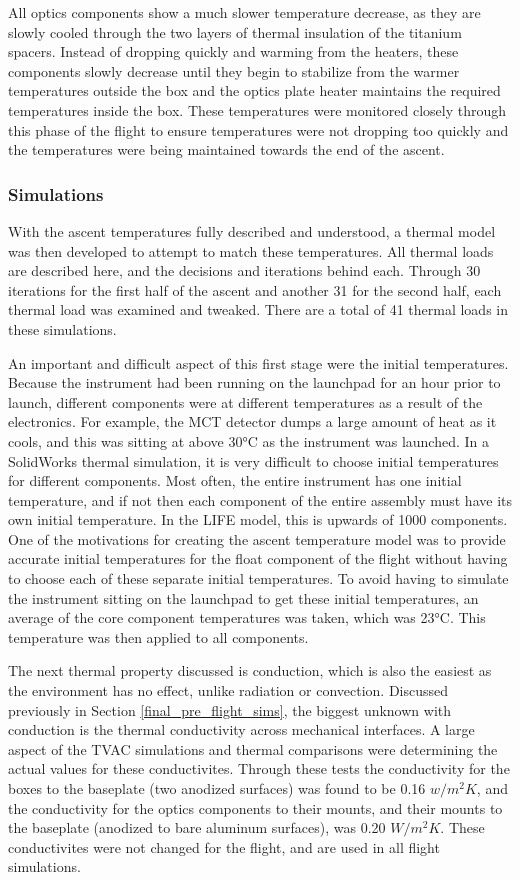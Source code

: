All optics components show a much slower temperature decrease, as they are slowly cooled through the two layers of thermal insulation of the titanium spacers. Instead of dropping quickly and warming from the heaters, these components slowly decrease until they begin to stabilize from the warmer temperatures outside the box and the optics plate heater maintains the required temperatures inside the box. These temperatures were monitored closely through this phase of the flight to ensure temperatures were not dropping too quickly and the temperatures were being maintained towards the end of the ascent.

\subsubsection{Simulations}
With the ascent temperatures fully described and understood, a thermal model was then developed to attempt to match these temperatures. All thermal loads are described here, and the decisions and iterations behind each. Through 30 iterations for the first half of the ascent and another 31 for the second half, each thermal load was examined and tweaked. There are a total of 41 thermal loads in these simulations.

An important and difficult aspect of this first stage were the initial temperatures. Because the instrument had been running on the launchpad for an hour prior to launch, different components were at different temperatures as a result of the electronics. For example, the MCT detector dumps a large amount of heat as it cools, and this was sitting at above 30°C as the instrument was launched. In a SolidWorks thermal simulation, it is very difficult to choose initial temperatures for different components. Most often, the entire instrument has one initial temperature, and if not then each component of the entire assembly must have its own initial temperature. In the LIFE model, this is upwards of 1000 components. One of the motivations for creating the ascent temperature model was to provide accurate initial temperatures for the float component of the flight without having to choose each of these separate initial temperatures. To avoid having to simulate the instrument sitting on the launchpad to get these initial temperatures, an average of the core component temperatures was taken, which was 23°C. This temperature was then applied to all components. 

The next thermal property discussed is conduction, which is also the easiest as the environment has no effect, unlike radiation or convection. Discussed previously in Section \ref{final_pre_flight_sims}, the biggest unknown with conduction is the thermal conductivity across mechanical interfaces. A large aspect of the TVAC simulations and thermal comparisons were determining the actual values for these conductivites. Through these tests the conductivity for the boxes to the baseplate (two anodized surfaces) was found to be 0.16 $w/m^2K$, and the conductivity for the optics components to their mounts, and their mounts to the baseplate (anodized to bare aluminum surfaces), was 0.20 $W/m^2K$. These conductivites were not changed for the flight, and are used in all flight simulations.

